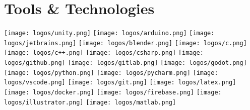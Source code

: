 \documentclass[a4paper,11pt]{article}
\begin{document}
\section*{Tools \& Technologies}
\begin{center}
  \texttt{[image: logos/unity.png]}
  \texttt{[image: logos/arduino.png]}
  \texttt{[image: logos/jetbrains.png]}
  \texttt{[image: logos/blender.png]}
  \texttt{[image: logos/c.png]}
  \texttt{[image: logos/c++.png]}
  \texttt{[image: logos/csharp.png]}
  \texttt{[image: logos/github.png]}
  \texttt{[image: logos/gitlab.png]}
  \texttt{[image: logos/godot.png]}
  \texttt{[image: logos/python.png]}
  \texttt{[image: logos/pycharm.png]}
  \texttt{[image: logos/vscode.png]}
  \texttt{[image: logos/git.png]}
  \texttt{[image: logos/latex.png]}
  \texttt{[image: logos/docker.png]}
  \texttt{[image: logos/firebase.png]}
  \texttt{[image: logos/illustrator.png]}
  \texttt{[image: logos/matlab.png]}
\end{center}
\end{document}

